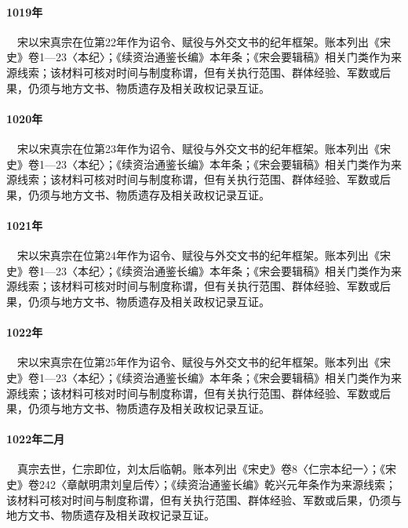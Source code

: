 \paragraph{1019年}　宋以宋真宗在位第22年作为诏令、赋役与外交文书的纪年框架。账本列出《宋史》卷1—23〈本纪〉；《续资治通鉴长编》本年条；《宋会要辑稿》相关门类作为来源线索；该材料可核对时间与制度称谓，但有关执行范围、群体经验、军数或后果，仍须与地方文书、物质遗存及相关政权记录互证。

\paragraph{1020年}　宋以宋真宗在位第23年作为诏令、赋役与外交文书的纪年框架。账本列出《宋史》卷1—23〈本纪〉；《续资治通鉴长编》本年条；《宋会要辑稿》相关门类作为来源线索；该材料可核对时间与制度称谓，但有关执行范围、群体经验、军数或后果，仍须与地方文书、物质遗存及相关政权记录互证。

\paragraph{1021年}　宋以宋真宗在位第24年作为诏令、赋役与外交文书的纪年框架。账本列出《宋史》卷1—23〈本纪〉；《续资治通鉴长编》本年条；《宋会要辑稿》相关门类作为来源线索；该材料可核对时间与制度称谓，但有关执行范围、群体经验、军数或后果，仍须与地方文书、物质遗存及相关政权记录互证。

\paragraph{1022年}　宋以宋真宗在位第25年作为诏令、赋役与外交文书的纪年框架。账本列出《宋史》卷1—23〈本纪〉；《续资治通鉴长编》本年条；《宋会要辑稿》相关门类作为来源线索；该材料可核对时间与制度称谓，但有关执行范围、群体经验、军数或后果，仍须与地方文书、物质遗存及相关政权记录互证。

\paragraph{1022年二月}　真宗去世，仁宗即位，刘太后临朝。账本列出《宋史》卷8〈仁宗本纪一〉；《宋史》卷242〈章献明肃刘皇后传〉；《续资治通鉴长编》乾兴元年条作为来源线索；该材料可核对时间与制度称谓，但有关执行范围、群体经验、军数或后果，仍须与地方文书、物质遗存及相关政权记录互证。

